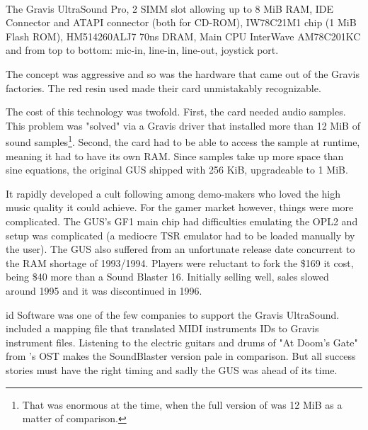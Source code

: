 \\
\par
The Gravis UltraSound Pro,  2 SIMM slot allowing up to 8 MiB RAM,  IDE Connector and  ATAPI connector (both for CD-ROM),  IW78C21M1 chip (1 MiB Flash ROM),  HM514260ALJ7 70ns DRAM,  Main CPU InterWave AM78C201KC and  from top to bottom: mic-in, line-in, line-out, joystick port.\\

The concept was aggressive and so was the hardware that came out of the Gravis factories. The red resin used made their card unmistakably recognizable.\\
\par
The cost of this technology was twofold. First, the card needed audio samples. This problem was "solved" via a Gravis driver that installed more than 12 MiB of sound samples\footnote{That was enormous at the time, when the full version of \doom{} was 12 MiB as a matter of comparison.}. Second, the card had to be able to access the sample at runtime, meaning it had to have its own RAM. Since samples take up more space than sine equations, the original GUS shipped with 256 KiB, upgradeable to 1 MiB.\\
\par
It rapidly developed a cult following among demo-makers who loved the high music quality it could achieve. For the gamer market however, things were more complicated. The GUS's GF1 main chip had difficulties emulating the OPL2 and setup was complicated (a mediocre TSR emulator had to be loaded manually by the user). The GUS also suffered from an unfortunate release date concurrent to the RAM shortage of 1993/1994. Players were reluctant to fork the \$169 it cost, being \$40 more than a Sound Blaster 16. Initially selling well, sales slowed around 1995 and it was discontinued in 1996.\\
\par
 id Software was one of the few companies to support the Gravis UltraSound. \doom{} included a mapping file that translated MIDI instruments IDs to Gravis  instrument files. Listening to the electric guitars and drums of "At Doom's Gate" from \doom{}'s OST makes the SoundBlaster version pale in comparison. But all success stories must have the right timing and sadly the GUS was ahead of its time.

